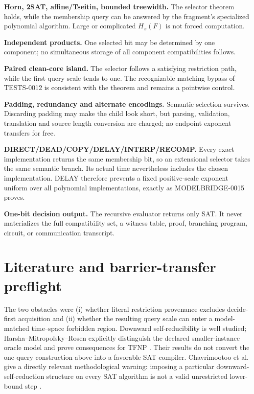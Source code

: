 \documentclass[11pt]{article}
\begin{document}
\begin{description}[leftmargin=0cm,labelwidth=0cm]
\item[] \textbf{Horn, 2SAT, affine/Tseitin, bounded treewidth.}
The selector theorem holds, while the membership query can be answered by the
fragment's specialized polynomial algorithm.  Large or complicated
$H_x(F)$ is not forced computation.
\item[] \textbf{Independent products.}
One selected bit may be determined by one component; no simultaneous storage
of all component compatibilities follows.
\item[] \textbf{Paired clean-core island.}
The selector follows a satisfying restriction path, while the first query
scale tends to one.  The recognizable matching bypass of TESTS-0012 is
consistent with the theorem and remains a pointwise control.
\item[] \textbf{Padding, redundancy and alternate encodings.}
Semantic selection survives.  Discarding padding may make the child look
short, but parsing, validation, translation and source length conversion are
charged; no endpoint exponent transfers for free.
\item[] \textbf{DIRECT/DEAD/COPY/DELAY/INTERP/RECOMP.}
Every exact implementation returns the same membership bit, so an extensional
selector takes the same semantic branch.  Its actual time nevertheless
includes the chosen implementation.  DELAY therefore prevents a fixed
positive-scale exponent uniform over all polynomial implementations, exactly
as MODELBRIDGE-0015 proves.
\item[] \textbf{One-bit decision output.}
The recursive evaluator returns only SAT.  It never materializes the full
compatibility set, a witness table, proof, branching program, circuit, or
communication transcript.
\end{description}

\section{Literature and barrier-transfer preflight}

The two obstacles were (i) whether literal restriction provenance excludes
decide-first acquisition and (ii) whether the resulting query scale can enter
a model-matched time--space forbidden region.  Downward self-reducibility is
well studied; Harsha--Mitropolsky--Rosen explicitly distinguish the declared
smaller-instance oracle model and prove consequences for TFNP \cite{hmr}.
Their results do not convert the one-query construction above into a favorable
SAT compiler.  Chavrimootoo et al. give a directly relevant methodological
warning: imposing a particular downward-self-reduction structure on every SAT
algorithm is not a valid unrestricted lower-bound step \cite{chkln}.
\end{document}

